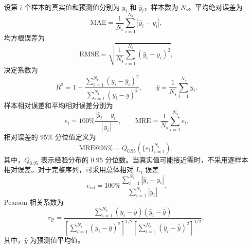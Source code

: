 设第 $i$ 个样本的真实值和预测值分别为 $y_i$ 和 $\widehat y_i$，样本数为 $N_{\mathrm s}$。平均绝对误差为
\begin{equation}
\mathrm{MAE}
=
\frac{1}{N_{\mathrm s}}
\sum_{i=1}^{N_{\mathrm s}}
\left|\widehat y_i-y_i\right|,
\label{eq:ch2_mae}
\end{equation}
均方根误差为
\begin{equation}
\mathrm{RMSE}
=
\sqrt{
\frac{1}{N_{\mathrm s}}
\sum_{i=1}^{N_{\mathrm s}}
\left(\widehat y_i-y_i\right)^2},
\label{eq:ch2_rmse}
\end{equation}
决定系数为
\begin{equation}
R^2
=
1-
\frac{
\sum_{i=1}^{N_{\mathrm s}}
\left(y_i-\widehat y_i\right)^2}
{
\sum_{i=1}^{N_{\mathrm s}}
\left(y_i-\bar y\right)^2},
\qquad
\bar y
=
\frac{1}{N_{\mathrm s}}
\sum_{i=1}^{N_{\mathrm s}}y_i.
\label{eq:ch2_r2}
\end{equation}
样本相对误差和平均相对误差分别为
\begin{equation}
e_i
=
100\%
\frac{|\widehat y_i-y_i|}{|y_i|},
\qquad
\mathrm{MRE}
=
\frac{1}{N_{\mathrm s}}
\sum_{i=1}^{N_{\mathrm s}}e_i.
\label{eq:ch2_mre}
\end{equation}
相对误差的 $95\%$ 分位值定义为
\begin{equation}
\mathrm{MRE@95\%}
=
Q_{0.95}
\left(\{e_i\}_{i=1}^{N_{\mathrm s}}\right),
\label{eq:ch2_mre95}
\end{equation}
其中，$Q_{0.95}$ 表示经验分布的 $0.95$ 分位数。当真实值可能接近零时，不采用逐样本相对误差。对于完整序列，可采用总体相对 $L_1$ 误差
\begin{equation}
e_{\mathrm{rel}}
=
100\%
\frac{
\sum_{i=1}^{N_{\mathrm s}}|\widehat y_i-y_i|}
{
\sum_{i=1}^{N_{\mathrm s}}|y_i|}.
\label{eq:ch2_mean_relative_error}
\end{equation}
Pearson 相关系数为
\begin{equation}
r_{\mathrm P}
=
\frac{
\sum_{i=1}^{N_{\mathrm s}}
(y_i-\bar y)(\widehat y_i-\overline{\widehat y})}
{
\left[\sum_{i=1}^{N_{\mathrm s}}(y_i-\bar y)^2\right]^{1/2}
\left[\sum_{i=1}^{N_{\mathrm s}}(\widehat y_i-\overline{\widehat y})^2\right]^{1/2}},
\label{eq:ch2_pearson}
\end{equation}
其中，$\overline{\widehat y}$ 为预测值平均值。

